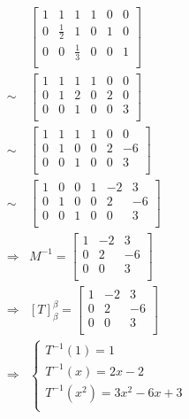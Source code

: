 \documentclass{article}
\begin{document}
\begin{equation*}
\begin{split}
&\left[\begin{array}{ccc|ccc}
1 & 1 & 1 & 1 & 0 & 0\\
0 & \frac{1}{2} & 1 & 0 & 1 & 0\\
0 & 0 & \frac{1}{3} & 0 & 0 & 1\\
\end{array}\right]\\
\sim &\left[\begin{array}{ccc|ccc}
1 & 1 & 1 & 1 & 0 & 0\\
0 & 1 & 2 & 0 & 2 & 0\\
0 & 0 & 1 & 0 & 0 & 3\\
\end{array}\right]\\
\sim &\left[\begin{array}{ccc|ccc}
1 & 1 & 1 & 1 & 0 & 0\\
0 & 1 & 0 & 0 & 2 & -6\\
0 & 0 & 1 & 0 & 0 & 3\\
\end{array}\right]\\
\sim &\left[\begin{array}{ccc|ccc}
1 & 0 & 0 & 1 & -2 & 3\\
0 & 1 & 0 & 0 & 2 & -6\\
0 & 0 & 1 & 0 & 0 & 3\\
\end{array}\right]\\
\Rightarrow & M^{-1}=\left[\begin{array}{ccc}
1&-2&3\\
0&2&-6\\
0&0&3\\
\end{array}\right]\\
\Rightarrow &\left[T\right]^\beta_\beta=\left[\begin{array}{ccc}
1&-2&3\\
0&2&-6\\
0&0&3\\
\end{array}\right]\\
\Rightarrow &\begin{cases}
T^{-1}(1)=1\\
T^{-1}(x)=2x-2\\
T^{-1}(x^2)=3x^2-6x+3\\
\end{cases}\\
\end{split}
\end{equation*}
\end{document}
